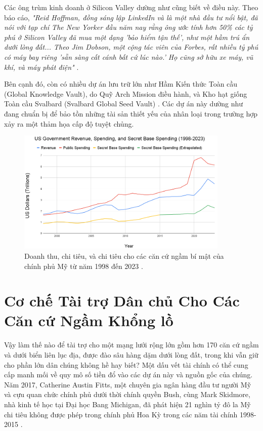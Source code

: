 Các ông trùm kinh doanh ở Silicon Valley dường như cũng biết về điều này. Theo báo cáo, \textit{"Reid Hoffman, đồng sáng lập LinkedIn và là một nhà đầu tư nổi bật, đã nói với tạp chí The New Yorker đầu năm nay rằng ông ước tính hơn 50\% các tỷ phú ở Silicon Valley đã mua một dạng 'bảo hiểm tận thế', như một hầm trú ẩn dưới lòng đất... Theo Jim Dobson, một cộng tác viên của Forbes, rất nhiều tỷ phú có máy bay riêng 'sẵn sàng cất cánh bất cứ lúc nào.' Họ cũng sở hữu xe máy, vũ khí, và máy phát điện"} \cite{28}.

Bên cạnh đó, còn có nhiều dự án lưu trữ lớn như Hầm Kiến thức Toàn cầu (Global Knowledge Vault), do Quỹ Arch Mission điều hành, \cite{29} và Kho hạt giống Toàn cầu Svalbard (Svalbard Global Seed Vault) \cite{30}. Các dự án này dường như đang chuẩn bị để bảo tồn những tài sản thiết yếu của nhân loại trong trường hợp xảy ra một thảm họa cấp độ tuyệt chủng.

\begin{figure}[t]
\begin{center}
\includegraphics[width=0.9\textwidth]{govcrop2.png}
\end{center}
   \caption{Doanh thu, chi tiêu, và chi tiêu cho các căn cứ ngầm bí mật của chính phủ Mỹ từ năm 1998 đến 2023 \cite{19}.}
   \label{fig:9}
\end{figure}
\section{Cơ chế Tài trợ Dân chủ Cho Các Căn cứ Ngầm Khổng lồ}

Vậy làm thế nào để tài trợ cho một mạng lưới rộng lớn gồm hơn 170 căn cứ ngầm và dưới biển liên lục địa, được đào sâu hàng dặm dưới lòng đất, trong khi vẫn giữ cho phần lớn dân chúng không hề hay biết? Một dấu vết tài chính có thể cung cấp manh mối về quy mô số tiền đổ vào các dự án này và nguồn gốc của chúng. Năm 2017, Catherine Austin Fitts, một chuyên gia ngân hàng đầu tư người Mỹ và cựu quan chức chính phủ dưới thời chính quyền Bush, cùng Mark Skidmore, nhà kinh tế học tại Đại học Bang Michigan, đã phát hiện 21 nghìn tỷ đô la Mỹ chi tiêu không được phép trong chính phủ Hoa Kỳ trong các năm tài chính 1998-2015 \cite{11,12,13}.

